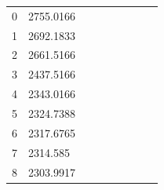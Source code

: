 \begin{longtable}{lllllllll}
0                        & 2755.0166    &           &                  &    &    &    &   &    \\
1                        & 2692.1833    &           &                  &    &    &    &   &    \\
2                        & 2661.5166    &           &                  &    &    &    &   &    \\
3                        & 2437.5166    &           &                  &    &    &    &   &    \\
4                        & 2343.0166    &           &                  &    &    &    &   &    \\
5                        & 2324.7388    &           &                  &    &    &    &   &    \\
6                        & 2317.6765    &           &                  &    &    &    &   &    \\
7                        & 2314.585     &           &                  &    &    &    &   &    \\
8                        & 2303.9917    &           &                  &    &    &    &   & \\
\hline
\end{longtable}

